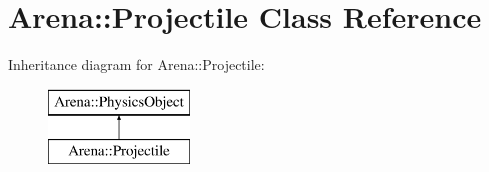 \hypertarget{class_arena_1_1_projectile}{\section{Arena\+:\+:Projectile Class Reference}
\label{class_arena_1_1_projectile}
}
Inheritance diagram for Arena\+:\+:Projectile\+:\begin{figure}[H]
\begin{center}
\leavevmode
\includegraphics[height=2.000000cm]{class_arena_1_1_projectile}
\end{center}
\end{figure}
